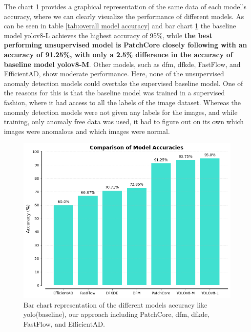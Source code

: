 The chart \ref{fig:bar chart models accruacy} provides a graphical representation of the same data of each model's accuracy, where we can clearly visualize the performance of different models. As can be seen in table \ref{tab:overall model accuracy} and bar chart \ref{fig:bar chart models accruacy} the baseline model \gls{yolo}v8-L achieves the highest accuracy of 95\%, while \textbf{the best performing unsupervised model is PatchCore closely following with an accuracy of 91.25\%, with only a 2.5\% difference in the accuracy of baseline model \gls{yolo}v8-M}. Other models, such as \gls{dfm}, \gls{dfkde}, FastFlow, and EfficientAD, show moderate performance. Here, none of the unsupervised anomaly detection models could overtake the supervised baseline model. One of the reasons for this is that the baseline model was trained in a supervised fashion, where it had access to all the labels of the image dataset. Whereas the anomaly detection models were not given any labels for the images, and while training, only anomaly free data was used, it had to figure out on its own which images were anomalous and which images were normal.

\begin{figure}[ht!]
    \centering
    \includegraphics[width=1.1\linewidth]{Rohit_Master_Thesis//Images/bar_chart_model_acc.png}
    \caption{Bar chart representation of the different models accuracy like \gls{yolo}(baseline), our approach including PatchCore, \gls{dfm}, \gls{dfkde}, FastFlow, and EfficientAD.}
    \label{fig:bar chart models accruacy}
\end{figure}

